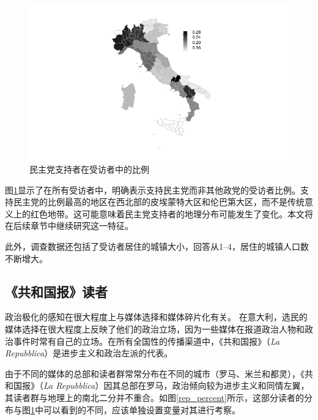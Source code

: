 \documentclass[12pt,a4paper]{ctexart}
\begin{document}
    \begin{figure}
        \centering
        \includegraphics[width=1\textwidth]{figure//unnamed-chunk-4-1.pdf}
        \caption{民主党支持者在受访者中的比例}
        \label{pd_percent}
    \end{figure}

    图\ref{pd_percent}显示了在所有受访者中，明确表示支持民主党而非其他政党的受访者比例。支持民主党的比例最高的地区在西北部的皮埃蒙特大区和伦巴第大区，而不是传统意义上的红色地带。这可能意味着民主党支持者的地理分布可能发生了变化。本文将在后续章节中继续研究这一特征。

    此外，调查数据还包括了受访者居住的城镇大小，回答从1--4，居住的城镇人口数不断增大。

    \subsection{《共和国报》读者}

    政治极化的感知在很大程度上与媒体选择和媒体碎片化有关。
    \cite{davis2016party}
    在意大利，选民的媒体选择在很大程度上反映了他们的政治立场，因为一些媒体在报道政治人物和政治事件时常有自己的立场。在所有全国性的传播渠道中，《共和国报》（\textit{La Repubblica}）是进步主义和政治左派的代表。
    \cite{tomasini2011anni}

    由于不同的媒体的总部和读者群常常分布在不同的城市（罗马、米兰和都灵），《共和国报》（\textit{La Repubblica}）因其总部在罗马，政治倾向较为进步主义和同情左翼，其读者群与地理上的南北二分并不重合。如图\ref{rep_percent}所示，这部分读者的分布与图\ref{pd_percent}中可以看到的不同，应该单独设置变量对其进行考察。
\end{document}
